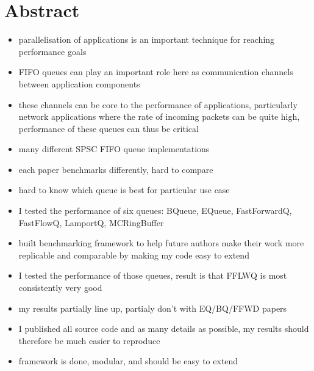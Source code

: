\section*{Abstract}
\begin{itemize}
    \item parallelisation of applications is an important technique for reaching performance goals
    \item FIFO queues can play an important role here as communication channels between application components
    \item these channels can be core to the performance of applications, particularly network applications
        where the rate of incoming packets can be quite high, performance of these queues can thus be critical
    \item many different SPSC FIFO queue implementations
    \item each paper benchmarks differently, hard to compare
    \item hard to know which queue is best for particular use case
    \item I tested the performance of six queues: BQueue, EQueue, FastForwardQ, FastFlowQ, LamportQ, MCRingBuffer
    \item built benchmarking framework to help future authors make their work more replicable and comparable
        by making my code easy to extend
    \item I tested the performance of those queues, result is that FFLWQ is most consistently very good
    \item my results partially line up, partialy don't with EQ/BQ/FFWD papers
    \item I published all source code and as many details as possible, my results should therefore be much easier to reproduce
    \item framework is done, modular, and should be easy to extend
\end{itemize}
